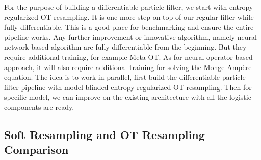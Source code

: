 \documentclass{article}
\begin{document}
For the purpose of building a differentiable particle filter, we start with entropy-regularized-OT-resampling. It is one more step on top of our regular filter while fully differentiable. This is a good place for benchmarking and ensure the entire pipeline works. Any further improvement or innovative algorithm, namely neural network based algorithm are fully differentiable from the beginning. But they require additional training, for example Meta-OT. As for neural operator based approach, it will also require additional training for solving the Monge-Ampère equation. The idea is to work in parallel, first build the differentiable particle filter pipeline with model-blinded entropy-regularized-OT-resampling. Then for specific model, we can improve on the existing architecture with all the logistic components are ready. 




\subsection{Soft Resampling and OT Resampling Comparison}
\end{document}
